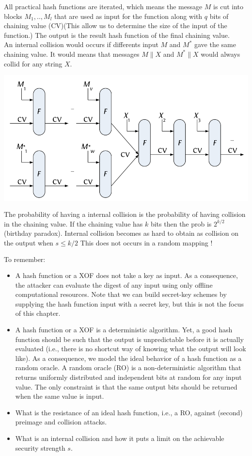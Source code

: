 \documentclass[11pt,a4paper]{report}
\begin{document}
All practical hash functions are iterated, which means the message $M$ is cut into blocks $M_1,..,M_l$ that are used as input for the function along with $q$ bits of chaining value (CV)(This allow us to determine the size of the input of the function.) The output is the result hash function of the final chaining value.\\
An internal collision would occurs if differents input $M$ and $M^*$ gave the same chaining value. It would means that messages $M \parallel X$ and $M^* \parallel X$ would always collid for any string $X$. 
\begin{center}
\includegraphics[scale=0.5]{img/img20.png}
\end{center}
The probability of having a internal collision is the probability of having collision in the chaining value. If the chaining value has $k$ bits then the prob is $2^{k/2}$ (birthday paradox). Internal collision becomes as hard to obtain as collision on the output when $s \leq k/2$
This does not occurs in a random mapping !

To remember:
\begin{itemize}
\item A hash function or a XOF does not take a key as input. As a consequence, the attacker can evaluate the digest of any input using only offline computational resources. Note that we can build secret-key schemes by supplying the hash function input with a secret key, but this is not the focus of this chapter.
\item  A hash function or a XOF is a deterministic algorithm. Yet, a good hash function should be such that the output is unpredictable before it is actually evaluated (i.e., there is no shortcut way of knowing what the output will look like). As a consequence, we model the ideal behavior of a hash function as a random oracle. A random oracle (RO) is a non-deterministic algorithm that returns uniformly distributed and independent bits at random for any input value. The only constraint is that the same output bits should be returned when the same value is input.
\item What is the resistance of an ideal hash function, i.e., a RO, against (second) preimage and collision attacks.
\item What is an internal collision and how it puts a limit on the achievable security strength $s$.
\end{itemize}
\end{document}
